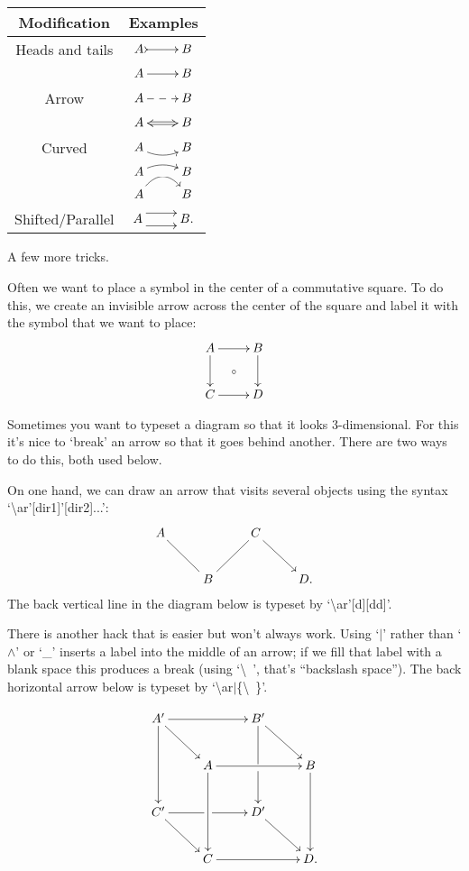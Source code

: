 \documentclass[letterpaper,10pt]{article}
\newcommand{\<}{\langle}
\renewcommand{\>}{\rangle}
\newcommand{\bsl}{\textbackslash}
\begin{document}
\begin{tabular}{c|c}
Modification & Examples \\\hline
Heads and tails & $\xymatrix{ A \ar@{>->}[r] & B}$ \\
		& $\xymatrix{ A \ar@[->>][r] & B}$ \\\hline
Arrow		& $\xymatrix{ A \ar@{-->}[r] & B}$ \\
		& $\xymatrix{ A \ar@{<=>}[r] & B}$\\\hline
Curved		& $\xymatrix{ A \ar@/_/[r] & B}$\\
		& $\xymatrix{ A \ar@/^/[r] & B}$\\
		& $\xymatrix{ A \ar@/^15pt/[r] & B}$\\\hline
Shifted/Parallel& $\xymatrix{ A \ar@<5pt>[r] \ar@<-5pt>[r] & B.}$\\
\end{tabular}

A few more tricks. 

Often we want to place a symbol in the center of a commutative square. To do this, we create an invisible arrow across the center of the square and label it with the symbol that we want to place:
$$\xymatrix{
A \ar[r] \ar[d]             & B \ar[d] \\
C \ar[r] \ar@{}[ru]|{\circ} & D \\
}$$

Sometimes you want to typeset a diagram so that it looks 3-dimensional. For this it's nice to `break' an arrow so that it goes behind another. There are two ways to do this, both used below. 

On one hand, we can draw an arrow that visits several objects using the syntax `\bsl ar'[dir1]'[dir2]...':
$$\xymatrix{
A \ar'[rd]'[rr][rrrd] &   & C & \\
                     & B &   & D. \\
}$$
The back vertical line in the diagram below is typeset by `\bsl ar'[d][dd]'.

There is another hack that is easier but won't always work. Using `$\mid$' rather than `$\wedge$' or `\_' inserts a label into the middle of an arrow; if we fill that label with a blank space this produces a break (using `\bsl\ ', that's ``backslash space''). The back horizontal arrow below is typeset by `\bsl ar$\mid$\{\bsl\ \}'.




$$\xymatrix{
A' \ar[rr] \ar[dd] \ar[rd]	&			& B' \ar'[d][dd] \ar[rd]	&		\\
				& A \ar[rr] \ar[dd]	&				& B \ar[dd]	\\
    C' \ar|{\ \ }[rr] \ar[rd]	&			& D' \ar[rd]			&		\\
				& C  \ar[rr]		&				& D.		\\
}$$
\end{document}
